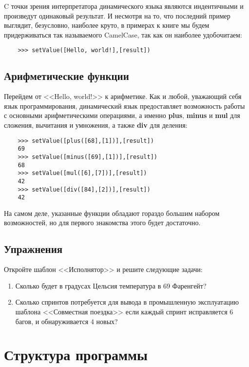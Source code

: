 \documentclass[10pt]{book}
\begin{document}
	C точки зрения интерпретатора динамического языка являются индентичными и произведут одинаковый результат. И несмотря на то, что последний пример выглядит, безусловно, наиболее круто, в примерах к книге мы будем придерживаться так называемого CamelCase, так как он наиболее удобочитаем:
	
	\begin{verbatim}
	>>> setValue([Hello, world!],[result])
	\end{verbatim}
	
	\section{Арифметические функции}
	
	Перейдем от <<Hello, world!>> к арифметике. Как и любой, уважающий себя язык программирования, динамический язык предоставляет возможность работы с основными арифметическими операциями, а именно {\bf plus}, {\bf minus} и {\bf mul} для сложения, вычитания и умножения, а также {\bf div} для деления:
	
	\begin{verbatim}
	>>> setValue([plus([68],[1])],[result])
	69
	>>> setValue([minus([69],[1])],[result])
	68
	>>> setValue([mul([6],[7])],[result])
	42
	>>> setValue([div([84],[2])],[result])
	42
	\end{verbatim}
	
	На самом деле, указанные функции обладают гораздо большим набором возможностей, но для первого знакомства этого будет достаточно. 
				
	\section{Упражнения}
	
	Откройте шаблон <<Исполнятор>> и решите следующие задачи:
	
	\begin{enumerate}
		\item Сколько будет в градусах Цельсия температура в 69 Фаренгейт?
		
		\item Сколько спринтов потребуется для вывода в промышленную эксплуатацию шаблона <<Совместная поездка>> если каждый спринт исправляется 6 багов, и обнаруживается 4 новых?
	\end{enumerate}
	
	
	\chapter{Структура программы}
	
\end{document}
